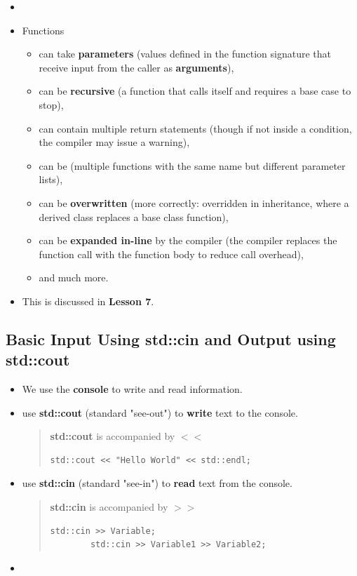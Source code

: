\documentclass[10pt]{article}
\newcommand{\vocab}[1]{\fbox{\textbf{\textit{#1}}}}
\begin{document}
\begin{itemize}
	\item {}
		\item Functions 
			\begin{itemize}

				\item can take \textbf{parameters} (values defined in the function signature that receive input from the caller as \textbf{arguments}), 
				\item can be \textbf{recursive} (a function that calls itself and requires a base case to stop), 
				\item can contain multiple return statements (though if not inside a condition, the compiler may issue a warning), 
				\item can be \vocab{overloaded} (multiple functions with the same name but different parameter lists),
				\item can be \textbf{overwritten} (more correctly: overridden in inheritance, where a derived class replaces a base class function), 
				\item can be \textbf{expanded in-line} by the compiler (the compiler replaces the function call with the function body to reduce call overhead), 
				\item and much more.
			\end{itemize}
\item This is discussed in \textbf{Lesson 7}.
\end{itemize}

\newpage
\subsection{Basic Input Using std::cin and Output using std::cout}
\begin{itemize}
	\item We use the \textbf{console} to write and read information.\\ 
	\item use \textbf{std::cout} (standard "see-out") to \textbf{write} text to the console.
		\begin{quote}
		\textbf{std::cout} is accompanied by $<<$
		\begin{verbatim}
std::cout << "Hello World" << std::endl;
		\end{verbatim}
		\end{quote}
	\item use \textbf{std::cin} (standard "see-in") to \textbf{read} text from the console.
		\begin{quote}
		\textbf{std::cin} is accompanied by $>>$
		\begin{verbatim}
std::cin >> Variable;
		std::cin >> Variable1 >> Variable2;
		\end{verbatim}
		\end{quote}

	\item {}
\end{itemize}
\end{document}
